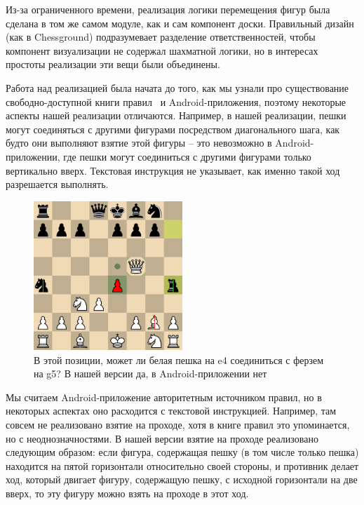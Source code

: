 \documentclass{article}
\begin{document}
Из-за ограниченного времени, реализация логики перемещения фигур была сделана 
в том же самом модуле, как и сам компонент доски.
Правильный дизайн (как в Chessground) подразумевает разделение ответственностей,
чтобы компонент визуализации не содержал шахматной логики,
но в интересах простоты реализации эти вещи были объединены. 

Работа над реализацией была начата до того, как мы узнали про
существование свободно-доступной книги правил~\cite{chessplus-rules} и Android-приложения,
поэтому некоторые аспекты нашей реализации отличаются.
Например, в нашей реализации, пешки могут соединяться с другими фигурами посредством диагонального шага,
как будто они выполняют взятие этой фигуры --
это невозможно в Android-приложении, где пешки могут соединиться с другими фигурами
только вертикально вверх.
Текстовая инструкция не указывает, как именно такой ход разрешается выполнять.

\begin{figure}[h]
    \centering
    \includegraphics[width=0.5\textwidth]{img/diagonal-merging-question.png}
    \caption{В этой позиции, может ли белая пешка на e4 соединиться с ферзем на g5? В нашей версии да, в Android-приложении нет}
\end{figure}

Мы считаем Android-приложение авторитетным источником правил,
но в некоторых аспектах оно расходится с текстовой инструкцией.
Например, там совсем не реализовано взятие на проходе,
хотя в книге правил это упоминается, но с неоднозначностями.
В нашей версии взятие на проходе реализовано следующим образом:
если фигура, содержащая пешку (в том числе только пешка)
находится на пятой горизонтали относительно своей стороны,
и противник делает ход, который двигает фигуру, содержащую пешку,
с исходной горизонтали на две вверх,
то эту фигуру можно взять на проходе в этот ход.
\end{document}
